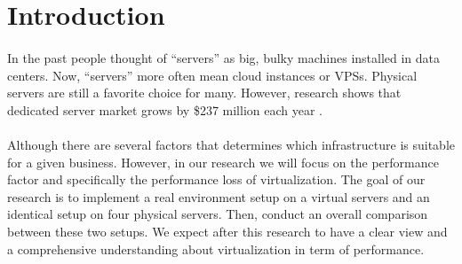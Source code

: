 \section{Introduction}
\paragraph{}
In the past people thought of “servers” as big, bulky machines installed in data centers. Now, “servers” more often mean cloud instances or VPSs. Physical servers are still a favorite choice for many. However, research shows that dedicated server market grows by \$237 million each year \cite{c1}. 
\paragraph{}
Although there are several factors that determines which infrastructure is suitable for a given business. However, in our research we will focus on the performance factor and specifically the performance loss of virtualization. The goal of our research is to implement a real environment setup on a virtual servers and an identical setup on four physical servers. Then, conduct an overall comparison between these two setups. We expect after this research to have a clear view and a comprehensive understanding about virtualization in term of performance. 
